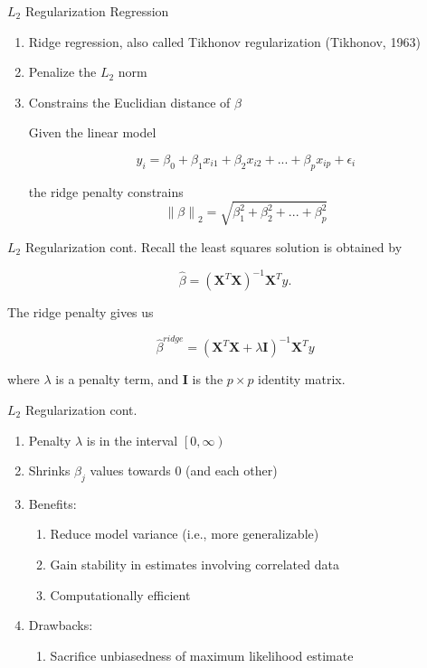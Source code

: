\documentclass[pdf]{beamer}
\newcommand\norm[1]{\left\lVert#1\right\rVert}
\begin{document}
		\begin{frame}{$L_2$ Regularization Regression}
		\begin{enumerate}
			\item Ridge regression, also called Tikhonov regularization (Tikhonov, 1963)
			\item Penalize the $L_2$ norm 
			\item Constrains the Euclidian distance of $\beta$	
				\newline
				
				Given the linear model
				\vspace{-1.5em}
				\begin{center}
				$$ y_i = \beta_0 + \beta_1x_{i1} + \beta_2x_{i2} + ... + \beta_px_{ip} + \epsilon_i $$
				\end{center}
			
				the ridge penalty constrains
				$$ \norm{\beta}_2 = \sqrt{\beta_{1}^2 + \beta_{2}^2 + ... + \beta_{p}^2} $$
		\end{enumerate}
		\end{frame}
		
		
		\begin{frame}{$L_2$ Regularization cont.}
			Recall the least squares solution is obtained by
			\vspace{-1em}
			\begin{center}
				$$ \widehat{\beta} = \left(\bm{X}^T\bm{X}\right)^{-1} \bm{X}^Ty. $$
			\end{center}
			The ridge penalty gives us
			\vspace{-1em}
			\begin{center}
				$$ \widehat{\beta}^{ridge} = \left(\bm{X}^T\bm{X} + \lambda\bm{I}\right)^{-1} \bm{X}^Ty $$
			\end{center}
			\vspace{1em}
			where $\lambda$ is a penalty term, and $\bm{I}$ is the $p \times p$ identity matrix.
		\end{frame}
		
		
		\begin{frame}{$L_2$ Regularization cont.}
		\begin{enumerate}
			\item Penalty $\lambda$ is in the interval $\left[0, \infty \right)$
			\item Shrinks $\beta_j$ values towards $0$ (and each other)  
			\item Benefits: 
				\begin{enumerate}[1]
					\item Reduce model variance (i.e., more generalizable)
					\item Gain stability in estimates involving correlated data
					\item Computationally efficient
				\end{enumerate}
							
			\item Drawbacks:
				\begin{enumerate}[1] 
					\item Sacrifice unbiasedness of maximum likelihood estimate 
				\end{enumerate}
		\end{enumerate}
		\end{frame}
		
\end{document}
